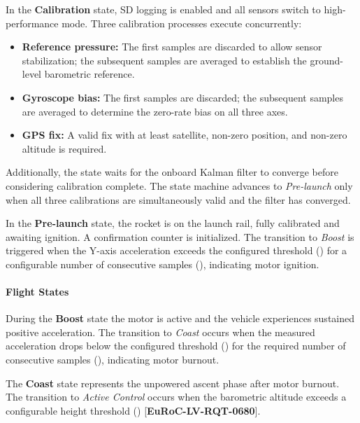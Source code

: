 \documentclass[11pt, a4paper]{article} %
\newcommand{\req}[1]{[\textcolor{EtseNavy}{\textbf{#1}}]}
\begin{document}
In the \textbf{Calibration} state, SD logging is enabled and all sensors switch to high-performance mode. Three calibration processes execute concurrently:
\begin{itemize}
    \item \textbf{Reference pressure:} The first  samples are discarded to allow sensor stabilization; the subsequent  samples are averaged to establish the ground-level barometric reference.
    \item \textbf{Gyroscope bias:} The first  samples are discarded; the subsequent  samples are averaged to determine the zero-rate bias on all three axes.
    \item \textbf{GPS fix:} A valid fix with at least  satellite, non-zero position, and non-zero altitude is required.
\end{itemize}
Additionally, the state waits for the onboard Kalman filter to converge before considering calibration complete. The state machine advances to \emph{Pre-launch} only when all three calibrations are simultaneously valid and the filter has converged.

In the \textbf{Pre-launch} state, the rocket is on the launch rail, fully calibrated and awaiting ignition. A confirmation counter is initialized. The transition to \emph{Boost} is triggered when the Y-axis acceleration exceeds the configured threshold () for a configurable number of consecutive samples (), indicating motor ignition.

\paragraph{Flight States}

During the \textbf{Boost} state the motor is active and the vehicle experiences sustained positive acceleration. The transition to \emph{Coast} occurs when the measured acceleration drops below the configured threshold () for the required number of consecutive samples (), indicating motor burnout.

The \textbf{Coast} state represents the unpowered ascent phase after motor burnout. The transition to \emph{Active Control} occurs when the barometric altitude exceeds a configurable height threshold () \req{EuRoC-LV-RQT-0680}.
\end{document}
